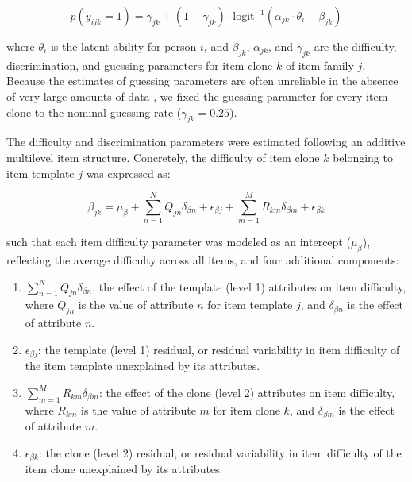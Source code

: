\documentclass[a4paper,man,natbib]{apa6}
\begin{document}
\begin{equation} \label{eq:1}
p(y_{ijk} = 1) = \gamma_{jk} + (1-\gamma_{jk}) \cdot \text{logit}^{-1} \left( \alpha_{jk} \cdot \theta_i - \beta_{jk} \right)
\end{equation}

\noindent where $\theta_i$ is the latent ability for person $i$, and $\beta_{jk}$, $\alpha_{jk}$, and $\gamma_{jk}$ are the difficulty, discrimination, and guessing parameters for item clone $k$ of item family $j$. Because the estimates of guessing parameters are often unreliable in the absence of very large amounts of data \citep{han2012fixing}, we fixed the guessing parameter for every item clone to the nominal guessing rate ($\gamma_{jk} = 0.25$).

The difficulty and discrimination parameters were estimated following an additive multilevel item structure. Concretely, the difficulty of item clone $k$ belonging to item template $j$ was expressed as:  

\begin{equation}
\beta_{jk} = \mu_\beta + \sum_{n=1}^N Q_{jn} \delta_{\beta n} + \epsilon_{\beta j} + \sum_{m=1}^M R_{km} \delta_{\beta m} + \epsilon_{\beta k}
\end{equation}

\noindent such that each item difficulty parameter was modeled as an intercept ($\mu_\beta$), reflecting the average difficulty across all items, and four additional components:

\begin{enumerate}

\item $\sum_{n=1}^N Q_{jn} \delta_{\beta n}$: the effect of the template (level 1) attributes on item difficulty, where $Q_{jn}$ is the value of attribute $n$ for item template $j$, and $\delta_{\beta n}$ is the effect of attribute $n$. 

\item $\epsilon_{\beta j}$: the template (level 1) residual, or residual variability in item difficulty of the item template unexplained by its attributes.

\item $\sum_{m=1}^M R_{km} \delta_{\beta m}$: the effect of the clone (level 2) attributes on item difficulty, where $R_{km}$ is the value of attribute $m$ for item clone $k$, and $\delta_{\beta m}$ is the effect of attribute $m$. 

\item $\epsilon_{\beta k}$: the clone (level 2) residual, or residual variability in item difficulty of the item clone unexplained by its attributes.

\end{enumerate}
\end{document}
